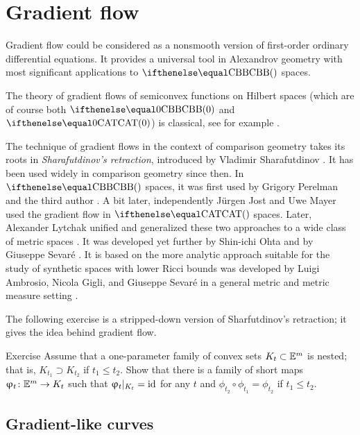 \chapter{Gradient flow}\label{chap:grad}

Gradient flow could be considered as a nonsmooth version of first-order ordinary differential equations.
It provides a universal tool in Alexandrov geometry with most significant applications to $\Alex{}{}$ spaces. 

The theory of gradient flows of semiconvex functions on Hilbert spaces (which are of course both  $\Alex{0}{}$ and $\CAT{0}$)  is classical, see for example \cite{Brezis-book}.

 The technique of gradient flows in the context of comparison geometry takes its roots in \emph{Sharafutdinov's retraction}, 
introduced by Vladimir Sharafutdinov \cite{sharafutdinov}. 
It has been used  widely in comparison geometry
since then.
In $\Alex{}$ spaces, it was first used by Grigory Perelman and the third author \cite{perelman-petrunin:qg, petrunin:qg}.
A bit later, independently Jürgen Jost and Uwe Mayer \cite{jost,mayer} 
used the gradient flow in $\CAT{}$ spaces.
Later, Alexander Lytchak unified and generalized these two approaches
to a wide class of metric spaces \cite{lytchak:open-map}.
It was developed  yet further by Shin-ichi Ohta \cite{ohta} and by Giuseppe Sevar\'e \cite{sevare}.
It is based on the more  analytic approach suitable for the study of synthetic spaces with lower Ricci bounds was developed by Luigi Ambrosio, Nicola Gigli, and  Giuseppe Sevar\'e in a general metric and metric measure setting 
\cite{ambrosio-gigli-savare}.

{\sloppy 
The following exercise is a stripped-down version of Sharfutdinov's retraction;
it gives the idea behind gradient flow.

}

\begin{thm}{Exercise}\label{ex:sharafutdinov}
Assume that a one-parameter family of convex sets $K_t\subset \EE^m$ is nested; 
that is, $K_{t_1}\supset K_{t_2}$ if $t_1\le t_2$.
Show that there is a family of short maps $\phi_t\:\EE^m\to K_t$ 
such that $\upvarphi_t|_{K_t}=\mathop{\rm id}\nolimits$ for any $t$ and $\phi_{t_2}\circ\phi_{t_1}=\phi_{t_2}$ if $t_1\le t_2$.
\end{thm}




\section{Gradient-like curves}\label{sec:gradient-like}



